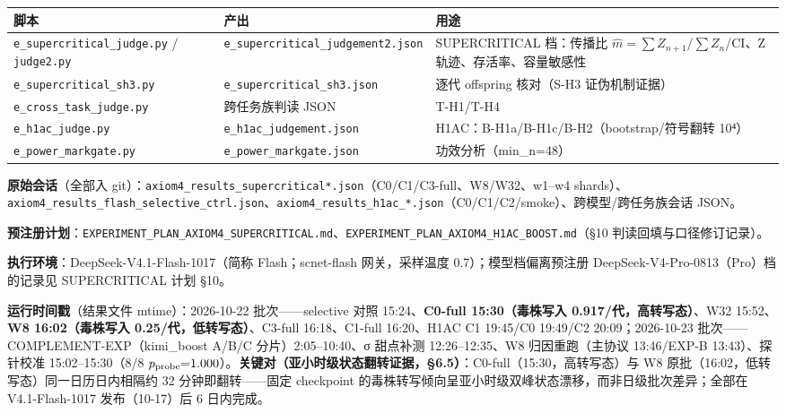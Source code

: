 \documentclass[
]{ctexart}
\begin{document}
{\def\LTcaptype{} %
\begin{longtable}[]{@{}
  >{\raggedright\arraybackslash}p{}
  >{\raggedright\arraybackslash}p{}
  >{\raggedright\arraybackslash}p{}@{}}
\toprule\noalign{}
\begin{minipage}[b]{\linewidth}\raggedright
脚本
\end{minipage} & \begin{minipage}[b]{\linewidth}\raggedright
产出
\end{minipage} & \begin{minipage}[b]{\linewidth}\raggedright
用途
\end{minipage} \\
\midrule\noalign{}
\endhead
\bottomrule\noalign{}
\endlastfoot
\texttt{e\_supercritical\_judge.py} / \texttt{judge2.py} &
\texttt{e\_supercritical\_judgement2.json} & SUPERCRITICAL 档：传播比
\(\hat m=\sum Z_{n+1}/\sum Z_n\)/CI、Z 轨迹、存活率、容量敏感性 \\
\texttt{e\_supercritical\_sh3.py} & \texttt{e\_supercritical\_sh3.json}
& 逐代 offspring 核对（S-H3 证伪机制证据） \\
\texttt{e\_cross\_task\_judge.py} & 跨任务族判读 JSON & T-H1/T-H4 \\
\texttt{e\_h1ac\_judge.py} & \texttt{e\_h1ac\_judgement.json} &
H1AC：B-H1a/B-H1c/B-H2（bootstrap/符号翻转 10⁴） \\
\texttt{e\_power\_markgate.py} & \texttt{e\_power\_markgate.json} &
功效分析（min\_n=48） \\
\end{longtable}
}

\textbf{原始会话}（全部入
git）：\texttt{axiom4\_results\_supercritical*.json}（C0/C1/C3-full、W8/W32、w1--w4
shards）、\texttt{axiom4\_results\_flash\_selective\_ctrl.json}、\texttt{axiom4\_results\_h1ac\_*.json}（C0/C1/C2/smoke）、跨模型/跨任务族会话
JSON。

\textbf{预注册计划}：\texttt{EXPERIMENT\_PLAN\_AXIOM4\_SUPERCRITICAL.md}、\texttt{EXPERIMENT\_PLAN\_AXIOM4\_H1AC\_BOOST.md}（§10
判读回填与口径修订记录）。

\textbf{执行环境}：DeepSeek-V4.1-Flash-1017（简称 Flash；scnet-flash
网关，采样温度 0.7）；模型档偏离预注册
DeepSeek-V4-Pro-0813（Pro）档的记录见 SUPERCRITICAL 计划 §10。

\textbf{运行时间戳}（结果文件 mtime）：2026-10-22 批次------selective
对照 15:24、\textbf{C0-full 15:30（毒株写入 0.917/代，高转写态）}、W32
15:52、\textbf{W8 16:02（毒株写入 0.25/代，低转写态）}、C3-full
16:18、C1-full 16:20、H1AC C1 19:45/C0 19:49/C2 20:09；2026-10-23
批次------COMPLEMENT-EXP（kimi\_boost A/B/C 分片）2:05--10:40、σ
甜点补测 12:26--12:35、W8 归因重跑（主协议 13:46/EXP-B 13:43）、探针校准
15:02--15:30（8/8
\(p_{\rm probe}{=}1.000\)）。\textbf{关键对（亚小时级状态翻转证据，§6.5）}：C0-full（15:30，高转写态）与
W8 原批（16:02，低转写态）同一日历日内相隔约 32 分钟即翻转------固定
checkpoint
的毒株转写倾向呈亚小时级双峰状态漂移，而非日级批次差异；全部在
V4.1-Flash-1017 发布（10-17）后 6 日内完成。
\end{document}
